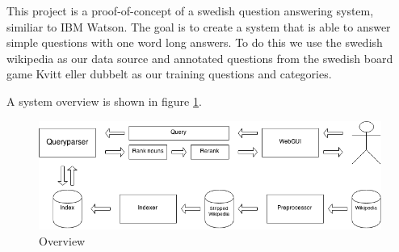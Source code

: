This project is a proof-of-concept of a swedish question answering system, similiar to IBM Watson.
The goal is to create a system that is able to answer simple questions with one word long answers.
To do this we use the swedish wikipedia as our data source and annotated questions from the swedish 
board game Kvitt eller dubbelt as our training questions and categories.

A system overview is shown in figure \ref{fig:overview}. 

\begin{figure}
\centering
\includegraphics[width=1\textwidth]{figures/Question-answering-system.png}
\caption{Overview}
\label{fig:overview}
\end{figure}
